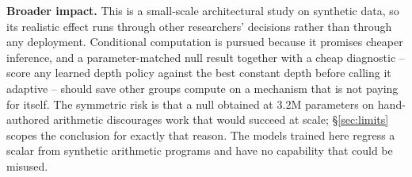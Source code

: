 \documentclass{article}
\begin{document}
\textbf{Broader impact.}
\label{app:impact}
This is a small-scale architectural study on synthetic data, so its realistic
effect runs through other researchers' decisions rather than through any
deployment. Conditional computation is pursued because it promises cheaper
inference, and a parameter-matched null result together with a cheap diagnostic
-- score any learned depth policy against the best constant depth before calling
it adaptive -- should save other groups compute on a mechanism that is not
paying for itself. The symmetric risk is that a null obtained at $3.2$M
parameters on hand-authored arithmetic discourages work that would succeed at
scale; \S\ref{sec:limits} scopes the conclusion for exactly that reason. The
models trained here regress a scalar from synthetic arithmetic programs and have
no capability that could be misused.
\end{document}
